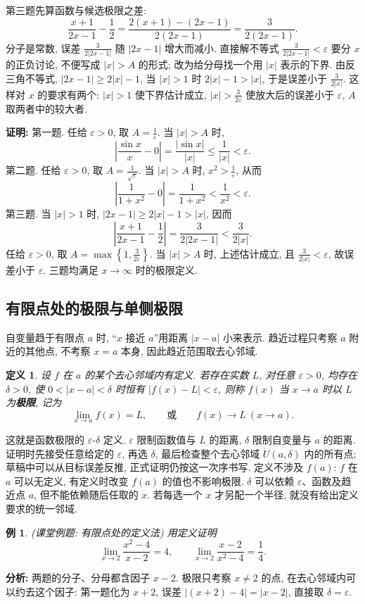 \documentclass[UTF8,openany]{ctexbook}
\theoremstyle{chinesetextbook}
\newtheorem{definition}{定义}[section]
\newtheorem{example}{例}[section]
\newenvironment{cnproof}{\par\indent\textbf{证明:} \ignorespaces}{\par}
\begin{document}
第三题先算函数与候选极限之差:
\[
\frac{x+1}{2x-1}-\frac12=\frac{2(x+1)-(2x-1)}{2(2x-1)}=\frac3{2(2x-1)}.
\]
分子是常数, 误差 $\displaystyle\frac3{2|2x-1|}$ 随 $|2x-1|$ 增大而减小. 直接解不等式 $\displaystyle\frac3{2|2x-1|}<\varepsilon$ 要分 $x$ 的正负讨论, 不便写成 $|x|>A$ 的形式; 改为给分母找一个用 $|x|$ 表示的下界. 由反三角不等式, $|2x-1|\ge2|x|-1$, 当 $|x|>1$ 时 $2|x|-1>|x|$, 于是误差小于 $\displaystyle\frac3{2|x|}$. 这样对 $x$ 的要求有两个: $|x|>1$ 使下界估计成立, $\displaystyle|x|>\frac3{2\varepsilon}$ 使放大后的误差小于 $\varepsilon$, $A$ 取两者中的较大者.
\begin{cnproof}
第一题. 任给 $\varepsilon>0$, 取 $\displaystyle A=\frac1\varepsilon$. 当 $|x|>A$ 时,
\[
\left|\frac{\sin x}x-0\right|=\frac{|\sin x|}{|x|}\le\frac1{|x|}<\varepsilon.
\]
第二题. 任给 $\varepsilon>0$, 取 $\displaystyle A=\frac1{\sqrt\varepsilon}$. 当 $|x|>A$ 时, $\displaystyle x^2>\frac1\varepsilon$, 从而
\[
\left|\frac1{1+x^2}-0\right|=\frac1{1+x^2}<\frac1{x^2}<\varepsilon.
\]
第三题. 当 $|x|>1$ 时, $|2x-1|\ge2|x|-1>|x|$, 因而
\[
\left|\frac{x+1}{2x-1}-\frac12\right|
=\frac3{2|2x-1|}<\frac3{2|x|}.
\]
任给 $\varepsilon>0$, 取 $\displaystyle A=\max\left\{1,\frac3{2\varepsilon}\right\}$. 当 $|x|>A$ 时, 上述估计成立, 且 $\displaystyle\frac3{2|x|}<\varepsilon$, 故误差小于 $\varepsilon$. 三题均满足 $x\to\infty$ 时的极限定义.
\end{cnproof}

\subsection{有限点处的极限与单侧极限}
自变量趋于有限点 $a$ 时, “$x$ 接近 $a$”用距离 $|x-a|$ 小来表示. 趋近过程只考察 $a$ 附近的其他点, 不考察 $x=a$ 本身, 因此趋近范围取去心邻域.
\begin{definition}
设 $f$ 在 $a$ 的某个去心邻域内有定义. 若存在实数 $L$, 对任意 $\varepsilon>0$, 均存在 $\delta>0$, 使 $0<|x-a|<\delta$ 时恒有 $|f(x)-L|<\varepsilon$, 则称 $f(x)$ 当 $x\to a$ 时以 $L$ 为\textbf{极限}, 记为
\[
\lim_{x\to a}f(x)=L,\qquad\text{或}\qquad f(x)\to L\ (x\to a).
\]
\end{definition}
这就是函数极限的 $\varepsilon$-$\delta$ 定义. $\varepsilon$ 限制函数值与 $L$ 的距离, $\delta$ 限制自变量与 $a$ 的距离. 证明时先接受任意给定的 $\varepsilon$, 再选 $\delta$, 最后检查整个去心邻域 $\mathring U(a,\delta)$ 内的所有点; 草稿中可以从目标误差反推, 正式证明仍按这一次序书写. 定义不涉及 $f(a)$: $f$ 在 $a$ 可以无定义, 有定义时改变 $f(a)$ 的值也不影响极限. $\delta$ 可以依赖 $\varepsilon$、函数及趋近点 $a$, 但不能依赖随后任取的 $x$. 若每选一个 $x$ 才另配一个半径, 就没有给出定义要求的统一邻域.
\begin{example}
\textnormal{(课堂例题: 有限点处的定义法)} 用定义证明
\[
\lim_{x\to2}\frac{x^2-4}{x-2}=4,\qquad
\lim_{x\to2}\frac{x-2}{x^2-4}=\frac14.
\]
\end{example}
\par\indent\textbf{分析:} 两题的分子、分母都含因子 $x-2$. 极限只考察 $x\ne2$ 的点, 在去心邻域内可以约去这个因子: 第一题化为 $x+2$, 误差 $|(x+2)-4|=|x-2|$, 直接取 $\delta=\varepsilon$.
\end{document}
